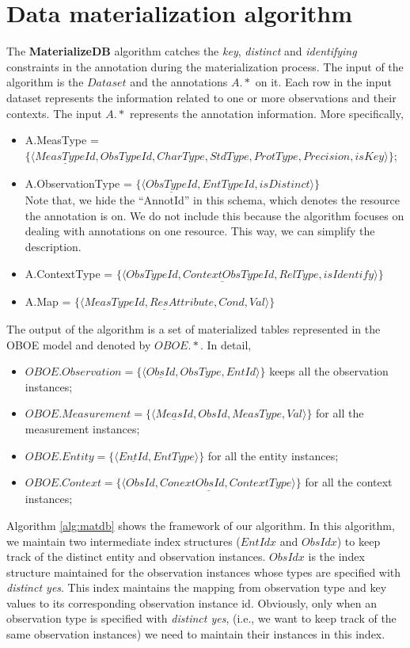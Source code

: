 \documentclass[10pt]{article}
\begin{document}
\section{Data materialization algorithm}
The {\bf MaterializeDB} algorithm catches the {\em key}, {\em distinct} and {\em identifying} constraints in the annotation during the materialization process. 
The input of the algorithm is the $Dataset$ and the annotations $A.*$ on it. 
Each row in the input dataset represents the information related to one or more observations and their contexts.
The input $A.*$ represents the annotation information.
More specifically,
\begin{itemize}
\item A.MeasType = $\{\langle \underline{MeasTypeId}, ObsTypeId, CharType, StdType, ProtType, Precision, isKey \rangle\}$;
\item A.ObservationType = $\{\langle \underline{ObsTypeId}, EntTypeId, isDistinct \rangle\}$ \\
	Note that, we hide the ``AnnotId'' in this schema, which denotes the resource the annotation is on.
    We do not include this because the algorithm focuses on dealing with annotations on one resource.
    This way, we can simplify the description.
\item A.ContextType = $\{\langle \underline{ObsTypeId, ContextObsTypeId, RelType}, isIdentify\rangle\}$
\item A.Map = $\{\langle \underline{MeasTypeId, ResAttribute, Cond}, Val\rangle\}$
\end{itemize}

The output of the algorithm is a set of materialized tables represented in the OBOE model and denoted by $OBOE.*$. In detail,
\begin{itemize}
\item $OBOE.Observation=\{\langle \underline{ObsId}, ObsType, EntId \rangle\}$ keeps all the observation instances;
\item $OBOE.Measurement=\{\langle \underline{MeasId}, ObsId, MeasType, Val\rangle\}$ for all the measurement instances;
\item $OBOE.Entity=\{\langle \underline{EntId}, EntType\rangle\}$ for all the entity instances;
\item $OBOE.Context =\{\langle \underline{ObsId, ConextObsId, ContextType}\rangle\}$ for all the context instances;
\end{itemize}

Algorithm \ref{alg:matdb} shows the framework of our algorithm. 
In this algorithm, we maintain two intermediate index structures ($EntIdx$ and $ObsIdx$) to keep track of the distinct entity and observation instances. 
$ObsIdx$ is the index structure maintained for the observation instances 
whose types are specified with {\em distinct yes}. 
This index maintains the mapping from observation type and key values to its corresponding observation instance id. 
Obviously, only when an observation type is specified with {\em distinct yes}, (i.e., we want to keep track of the same observation instances) we need to maintain their instances in this index. 
\end{document}
